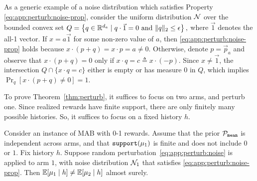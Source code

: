 \begin{remark}
As a generic example of a noise distribution which satisfies
  Property \eqref{eq:app:perturb:noise-prop}, consider the uniform
  distribution $\mathcal{N}$ over the bounded convex set
  $ Q = \left\{q \in \mathbb{R}^{d_a} \mid q \cdot \vec{1} = 0 \mbox{ and }
      \|q\|_2 \leq \epsilon\right\}, $
  where $\vec{1}$ denotes the all-1
  vector. If $x = a \vec{1}$ for some non-zero value of $a$, then
  \eqref{eq:app:perturb:noise-prop} holds because
  $x \cdot (p+q) = x \cdot p = a\neq 0.$
Otherwise, denote
  $p=\vec{p}_a$ and observe that $x\cdot({p}+ {q}) = 0$ only if
  $x \cdot q = c \triangleq x \cdot (-p)$. Since $x\neq \vec{1}$, the
  intersection $Q\cap\{ x\cdot q = c \}$ either is empty or has
  measure 0 in $Q$, which implies
  $\Pr_{{q}}\left[ x\cdot({p}+ {q}) \neq 0 \right] =1$.
\end{remark}


To prove Theorem~\ref{thm:perturb}, it suffices to focus on two arms, and perturb one. Since realized rewards have finite support, there are only finitely many possible histories. So, it suffices to focus on a fixed history $h$.

\begin{lemma}\label{lm:perturb}
Consider an instance of MAB with 0-1 rewards. Assume that the prior $\mathcal{P}_\mathtt{mean}$ is independent across arms, and that $\mathtt{support}(\mu_1)$ is finite and does not include $0$ or $1$. Fix history $h$. Suppose random perturbation~\eqref{eq:app:perturb:noise} is applied to arm $1$, with noise distribution $\mathcal{N}_1$ that satisfies \eqref{eq:app:perturb:noise-prop}. Then
    $\E[\mu_1\mid h] \neq \E[\mu_2\mid h] $
almost surely.
\end{lemma}

